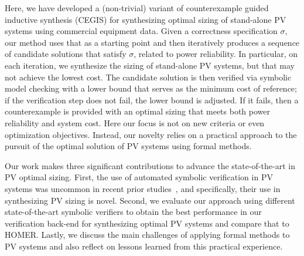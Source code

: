 \documentclass[runningheads]{llncs}
\begin{document}
Here, we have developed a (non-trivial) variant of counterexample guided inductive synthesis (CEGIS) for synthesizing optimal sizing of stand-alone PV systems using commercial equipment data. Given a correctness specification $\sigma$, our method uses that as a starting point and then iteratively produces a sequence of candidate solutions that satisfy $\sigma$, related to power reliability. In particular, on each iteration, we synthesize the sizing of stand-alone PV systems, but that may not achieve the lowest cost. The candidate solution is then verified via symbolic model checking with a lower bound that serves as the minimum cost of reference; if the verification step does not fail, the lower bound is adjusted. If it fails, then a counterexample is provided with an optimal sizing that meets both power reliability and system cost. Here our focus is not on new criteria or even optimization objectives. Instead, our novelty relies on a practical approach to the pursuit of the optimal solution of PV systems using formal methods. 

Our work makes three significant contributions to advance the state-of-the-art in PV optimal sizing. First, the use of automated symbolic verification in PV systems was uncommon in recent prior studies~\cite{TrindadeCordeiro19}, and specifically, their use in synthesizing PV sizing is novel. Second, we evaluate our approach using different state-of-the-art symbolic verifiers to obtain the best performance in our verification back-end for synthesizing optimal PV systems and compare that to HOMER. Lastly, we discuss the main challenges of applying formal methods to PV systems and also reflect on lessons learned from this practical experience.

\end{document}
